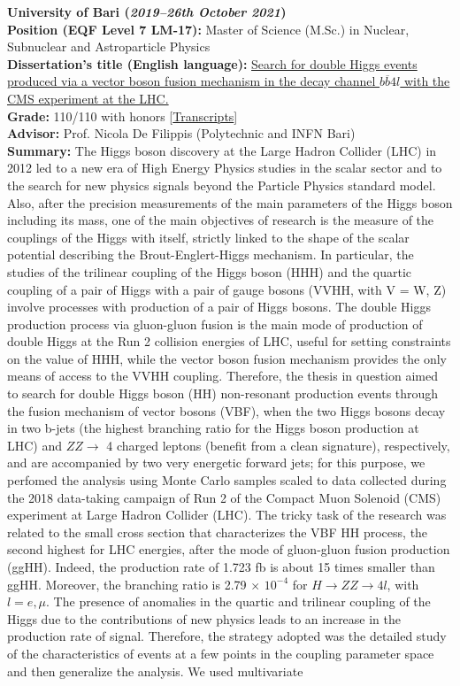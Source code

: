 \documentclass[11pt]{res}
\begin{document}
\begin{resume}
\textbf{University of Bari (\textit{2019--26th October 2021})}\\
\textbf{Position (EQF Level 7 LM-17):} Master of Science (M.Sc.) in Nuclear, Subnuclear and Astroparticle Physics\\
\textbf{Dissertation's title (English language):}
\href{https://inspirehep.net/literature/1955669}{Search for double Higgs events produced via a vector boson fusion mechanism in the decay channel $b\overline{b}4l$ with the CMS experiment at the LHC.}\\
\textbf{Grade:} 110/110 with honors [\href{https://drive.google.com/file/d/1V2sxudg9bGwW-S0WduNndtO60tdJLPUf/view?usp=sharing}{Transcripts}]\\
\textbf{Advisor:} Prof. Nicola De Filippis (Polytechnic and INFN Bari)\\
\textbf{Summary:} The Higgs boson discovery at the Large Hadron Collider (LHC) in 2012 led to a new era of High Energy Physics studies in the scalar sector and to the search for new physics signals beyond the Particle Physics standard model. Also, after the precision measurements of the main parameters of the Higgs boson including its mass, one of the main objectives of research is the measure of the couplings of the Higgs with itself, strictly linked to the shape of the scalar potential describing the Brout-Englert-Higgs mechanism. In particular, the studies of the trilinear coupling of the Higgs boson (HHH) and the quartic coupling of a pair of Higgs with a pair of gauge bosons (VVHH, with V = W, Z) involve processes with production of a pair of Higgs bosons. The double Higgs production process via gluon-gluon fusion is the main mode of production of double Higgs at the Run 2 collision energies of LHC, useful for setting constraints on the value of HHH, while the vector boson fusion mechanism provides the only means of access to the VVHH coupling. Therefore, the thesis in question aimed to search for double Higgs boson (HH) non-resonant production events through the fusion mechanism of vector bosons (VBF), when the two Higgs bosons decay in two b-jets (the highest branching ratio for the Higgs boson production at LHC) and $ZZ \to$ 4 charged leptons (benefit from a clean signature), respectively, and are accompanied by two very energetic forward jets; for this purpose, we perfomed the analysis using Monte Carlo samples scaled to data collected during the 2018 data-taking campaign of Run 2 of the Compact Muon Solenoid (CMS) experiment at Large Hadron Collider (LHC). The tricky task of the research was related to the small cross section that characterizes the VBF HH process, the second highest for LHC energies, after the mode of gluon-gluon fusion production (ggHH). Indeed, the production rate of 1.723 fb is about 15 times smaller than ggHH. Moreover, the branching ratio is 2.79 $\times$ $10^{-4}$ for $H\to ZZ\to 4l$, with $l = e, \mu$. The presence of anomalies in the quartic and trilinear coupling of the Higgs due to the contributions of new physics leads to an increase in the production rate of signal. Therefore, the strategy adopted was the detailed study of the characteristics of events at a few points in the coupling parameter space and then generalize the analysis. We used multivariate 
\end{resume}
\end{document}
